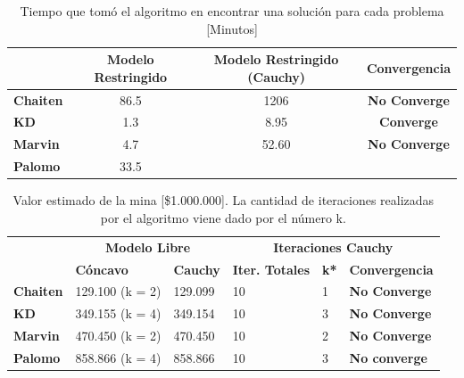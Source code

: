 \documentclass[12pt,letterpaper]{article}
\begin{document}
\begin{table}[H]
\centering
\begin{tabular}{|l|ccc|}
\hline
                 & \textbf{Modelo Restringido} & \textbf{Modelo Restringido (Cauchy)} & \textbf{Convergencia}  \\ \hline
\textbf{Chaiten} & 86.5                 & 1206              & \textbf{No Converge}                              \\ \hline
\textbf{KD}      & 1.3                   & 8.95               & \textbf{Converge}                                     \\ \hline
\textbf{Marvin}  & 4.7                 & 52.60              & \textbf{No Converge}                                    \\ \hline
\textbf{Palomo}  & 33.5                 &                &                                    \\ \hline
\end{tabular}
\caption{Tiempo que tomó el algoritmo en encontrar una solución para cada problema
[Minutos]}
\end{table}


\begin{table}[H]
\centering
\begin{tabular}{|l|ll|lll|}
\hline
                 & \multicolumn{2}{c|}{\textbf{Modelo Libre}} & \multicolumn{3}{c|}{\textbf{Iteraciones Cauchy}}                   \\ \cline{2-6} 
                 & \textbf{Cóncavo}         & \textbf{Cauchy}       & \textbf{Iter. Totales} & \textbf{k*} & \textbf{Convergencia} \\ \hline
\textbf{Chaiten} & 129.100 (k = 2)                  & 129.099              & 10                           & 1           & \textbf{No Converge}           \\ \hline
\textbf{KD}      & 349.155 (k = 4)                   & 349.154             & 10                            & 3           & \textbf{No Converge}              \\ \hline
\textbf{Marvin}  & 470.450 (k = 2)                   &  470.450                & 10                         & 2           & \textbf{No Converge}           \\ \hline
\textbf{Palomo}  & 858.866 (k = 4)                 & 858.866                  & 10                             & 3            & \textbf{No converge}         \\ \hline
\end{tabular}
\caption{Valor estimado de la mina [\$1.000.000]. La cantidad de iteraciones realizadas por el algoritmo viene dado por el número k.}
\end{table}
\end{document}
